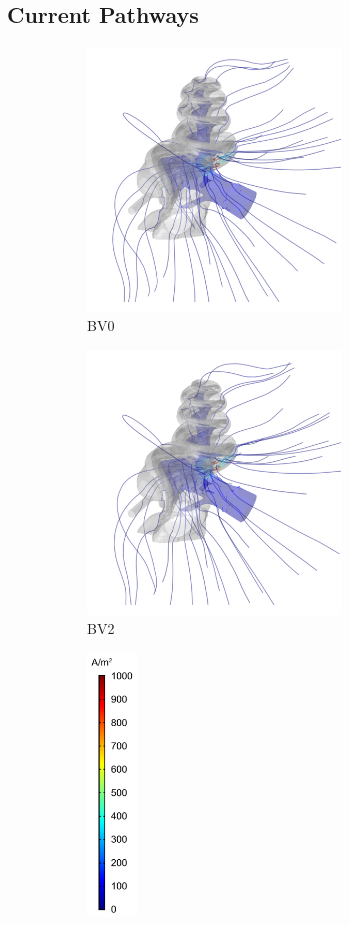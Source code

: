 \subsection{Current Pathways}

\begin{figure}[p]
	\centering
	
	\begin{subfigure}[t]{0.45\textwidth}
        \centering
        \includegraphics[height=7cm]{Simulations/Vasculature/streamlines-BV-noBV-blank}
        \caption{BV0}
        \label{fig:vasc_streams_noBV}
    \end{subfigure}%
    \begin{subfigure}[t]{0.45\textwidth}
        \centering
        \includegraphics[height=7cm]{Simulations/Vasculature/streamlines-BV-allBV-blank}
        \caption{BV2}
        \label{fig:vasc_streams_allBV}
    \end{subfigure}%
    \hfill%
    \begin{subfigure}[t]{0.09\textwidth}
        \centering
        \includegraphics[height=7cm]{Simulations/Vasculature/cbar_streamlines}
    \end{subfigure}%
    

\end{figure}
